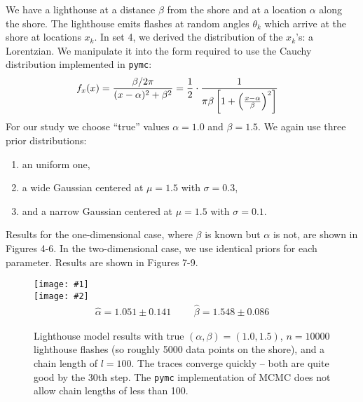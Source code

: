 \documentclass{article}
\theoremstyle{definition}
\renewcommand{\sp}[1]{\;\;\;\text{ #1 }\;\;\;}
\newcommand{\tbplop}[4]{
    \begin{figure}\centering
        \texttt{[image: \#1]}
        \\
        \texttt{[image: \#2]}
        {#3}\vspace{-20pt}
        \caption{\label{#1}#4}
    \end{figure}
}
\begin{document}
We have a lighthouse at a distance $\beta$ from the shore and
at a location $\alpha$ along the shore. The lighthouse emits
flashes at random angles $\theta_k$ which arrive at the shore
at locations $x_k$. In set 4, we derived the distribution of the
$x_k$'s: a Lorentzian. We manipulate it into the form required to
use the Cauchy distribution implemented in \texttt{pymc}:
\begin{align*}
f_x(x) &= {\beta / 2\pi \over (x - \alpha)^2 + \beta^2}
= {1 \over 2} \cdot {1 \over \pi\beta \left[1 + \left(x - \alpha \over \beta
\right)^2 \right]}
\end{align*}
For our study we choose ``true'' values $\alpha = 1.0$ and $\beta = 1.5$.
We again use three prior distributions:
\begin{enumerate}
\item an uniform one,
\item a wide Gaussian
centered at $\mu = 1.5$ with $\sigma = 0.3$,
\item and a narrow Gaussian centered at $\mu = 1.5$ with $\sigma = 0.1$.
\end{enumerate}
Results for the one-dimensional case, where $\beta$ is known but $\alpha$
is not, are shown in Figures 4-6.
In the two-dimensional case, we use identical priors for each parameter.
Results are shown in Figures 7-9.

\tbplop{alpha_100.png}{beta_100.png}
{\begin{align*}
\hat\alpha = 1.051 \pm 0.141
\sp{}
\hat\beta = 1.548 \pm 0.086
\end{align*}}
{
Lighthouse model results with true $(\alpha, \beta) = (1.0, 1.5)$,
$n = 10000$ lighthouse flashes (so roughly 5000 data points on the shore),
and a chain length of $l = 100$. The traces converge quickly -- both
are quite good by the 30th step. The \texttt{pymc} implementation of MCMC
does not allow chain lengths of less than 100.
}
\end{document}
